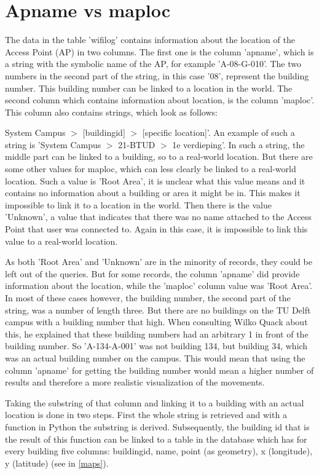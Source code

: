 \section{Apname vs maploc}
The data in the table 'wifilog' contains information about the location of the Access Point (AP) in two columns. The first one is the column 'apname', which is a string with the symbolic name of the AP, for example 'A-08-G-010'. The two numbers in the second part of the string, in this case '08', represent the building number. This building number can be linked to a location in the world. 
The second column which contains information about location, is the column 'maploc'. This column also contains strings, which look as follows:

System Campus $>$ [buildingid] $>$ [specific location]'. An example of such a string is 'System Campus $>$ 21-BTUD $>$ 1e verdieping'. In such a string, the middle part can be linked to a building, so to a real-world location. 
But there are some other values for maploc, which can less clearly be linked to a real-world location. Such a value is 'Root Area', it is unclear what this value means and it contains no information about a building or area it might be in. This makes it impossible to link it to a location in the world. Then there is the value 'Unknown', a value that indicates that there was no name attached to the Access Point that user was connected to. Again in this case, it is impossible to link this value to a real-world location. 

As both 'Root Area' and 'Unknown' are in the minority of records, they could be left out of the queries. But for some records, the column 'apname' did provide information about the location, while the 'maploc' column value was 'Root Area'. In most of these cases however, the building number, the second part of the string, was a number of length three. But there are no buildings on the TU Delft campus with a building number that high. When consulting Wilko Quack about this, he explained that these building numbers had an arbitrary 1 in front of the building number. So 'A-134-A-001' was not building 134, but building 34, which was an actual building number on the campus. This would mean that using the column 'apname' for getting the building number would mean a higher number of results and therefore a more realistic visualization of the movements. 

Taking the substring of that column and linking it to a building with an actual location is done in two steps. First the whole string is retrieved and with a function in Python the substring is derived. Subsequently, the building id that is the result of this function can be linked to a table in the database which has for every building five columns: buildingid, name, point (as geometry), x (longitude), y (latitude) (see in \autoref{maps}).


